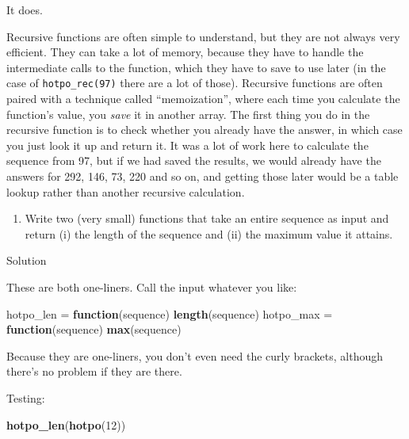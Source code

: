 \documentclass[]{tufte-book}
\newenvironment{Shaded}{}{}
\newcommand{\ControlFlowTok}[1]{\textcolor[rgb]{0.00,0.44,0.13}{\textbf{#1}}}
\newcommand{\DecValTok}[1]{\textcolor[rgb]{0.25,0.63,0.44}{#1}}
\newcommand{\KeywordTok}[1]{\textcolor[rgb]{0.00,0.44,0.13}{\textbf{#1}}}
\newcommand{\NormalTok}[1]{#1}
\newcommand{\StringTok}[1]{\textcolor[rgb]{0.25,0.44,0.63}{#1}}
\providecommand{\tightlist}{%
  \setlength{\itemsep}{0pt}\setlength{\parskip}{0pt}}
\theoremstyle{definition}
\theoremstyle{definition}
\theoremstyle{definition}
\theoremstyle{remark}
\begin{document}
It does.

Recursive functions are often simple to understand, but they are not
always very efficient. They can take a lot of memory, because they have
to handle the intermediate calls to the function, which they have to
save to use later (in the case of \texttt{hotpo\_rec(97)} there are a
lot of those). Recursive functions are often paired with a technique
called ``memoization'', where each time you calculate the function's
value, you \emph{save} it in another array. The first thing you do in
the recursive function is to check whether you already have the answer,
in which case you just look it up and return it. It was a lot of work
here to calculate the sequence from 97, but if we had saved the results,
we would already have the answers for 292, 146, 73, 220 and so on, and
getting those later would be a table lookup rather than another
recursive calculation.

\begin{enumerate}
\def\labelenumi{(\alph{enumi})}
\setcounter{enumi}{4}
\tightlist
\item
  Write two (very small) functions that take an entire sequence as input
  and return (i) the length of the sequence and (ii) the maximum value
  it attains.
\end{enumerate}

Solution

These are both one-liners. Call the input whatever you like:

\begin{Shaded}
\begin{Highlighting}[]
\NormalTok{hotpo_len =}\StringTok{ }\ControlFlowTok{function}\NormalTok{(sequence) }\KeywordTok{length}\NormalTok{(sequence)}
\NormalTok{hotpo_max =}\StringTok{ }\ControlFlowTok{function}\NormalTok{(sequence) }\KeywordTok{max}\NormalTok{(sequence)}
\end{Highlighting}
\end{Shaded}

Because they are one-liners, you don't even need the curly brackets,
although there's no problem if they are there.

Testing:

\begin{Shaded}
\begin{Highlighting}[]
\KeywordTok{hotpo_len}\NormalTok{(}\KeywordTok{hotpo}\NormalTok{(}\DecValTok{12}\NormalTok{))}
\end{Highlighting}
\end{Shaded}
\end{document}
